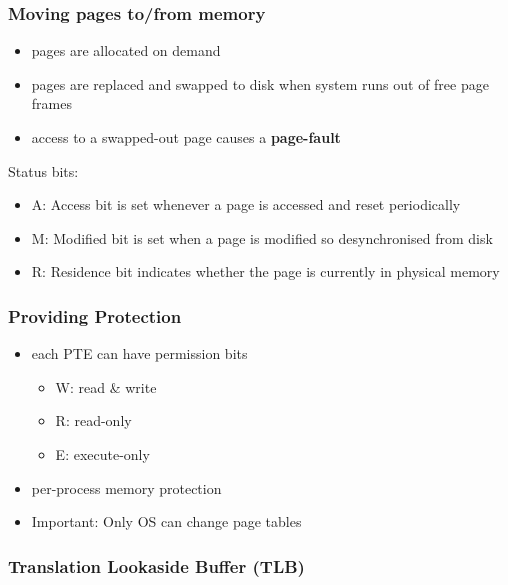 \documentclass{article}
\begin{document}
\subsubsection{Moving pages to/from memory}

\begin{itemize}
	\item pages are allocated on demand 
	\item pages are replaced and swapped to disk when system runs out of free page frames
	\item access to a swapped-out page causes a \textbf{page-fault}
\end{itemize}
Status bits:
\begin{itemize}
	\item A: Access bit is set whenever a page is accessed and reset periodically
	\item M: Modified bit is set when a page is modified so desynchronised from disk
	\item R: Residence bit indicates whether the page is currently in physical memory
\end{itemize}

\subsubsection{Providing Protection}

\begin{itemize}
	\item each PTE can have permission bits \begin{itemize}
		\item W: read \& write
		\item R: read-only
		\item E: execute-only
	\end{itemize}
	\item per-process memory protection
	\item Important: Only OS can change page tables
\end{itemize}

\subsubsection{Translation Lookaside Buffer (TLB)}
\end{document}
